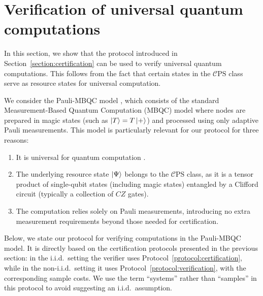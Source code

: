 \documentclass[a4paper,twocolumn,11pt,unpublished]{../../revision/quantumarticle}
\newcommand{\mCEPS}{\mathcal{C}\text{PS}}
\begin{document}
    

%

\section{Verification of universal quantum computations}
\label{section:VQC}

In this section, we show that the protocol introduced in Section~\ref{section:certification} can be used to verify universal quantum computations. This follows from the fact that certain states in the $\mCEPS$ class serve as resource states for universal computation.

We consider the Pauli-MBQC model \cite{SDKO07direct}, which consists of the standard Measurement-Based Quantum Computation (MBQC) model where nodes are prepared in magic states (such as $\ket{T} = T\ket{+}$) and processed using only adaptive Pauli measurements. This model is particularly relevant for our protocol for three reasons:
\begin{enumerate}
    \item It is universal for quantum computation \cite{SDKO07direct}.
    \item The underlying resource state $\ket{\Psi}$ belongs to the $\mCEPS$ class, as it is a tensor product of single-qubit states (including magic states) entangled by a Clifford circuit (typically a collection of $CZ$ gates).
    \item The computation relies solely on Pauli measurements, introducing no extra measurement requirements beyond those needed for certification.
\end{enumerate}
Below, we state our protocol for verifying computations in the Pauli-MBQC model. It is directly based on the certification protocols presented in the previous section: in the i.i.d.\ setting the verifier uses Protocol~\ref{protocol:certification}, while in the non-i.i.d.\ setting it uses Protocol~\ref{protocol:verification}, with the corresponding sample costs. We use the term ``systems'' rather than ``samples'' in this protocol to avoid suggesting an i.i.d.\ assumption.
\end{document}

